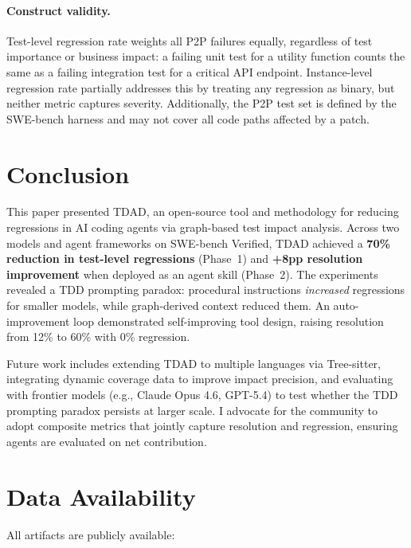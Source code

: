 \documentclass[sigconf,nonacm]{acmart}
\begin{document}
\paragraph{Construct validity.}
Test-level regression rate weights all P2P failures equally, regardless
of test importance or business impact: a failing unit test for a
utility function counts the same as a failing integration test for a
critical API endpoint.  Instance-level regression rate partially
addresses this by treating any regression as binary, but neither metric
captures severity.  Additionally, the P2P test set is defined by the
SWE-bench harness and may not cover all code paths affected by a patch.


\section{Conclusion}
\label{sec:conclusion}

This paper presented \textsc{TDAD}, an open-source tool and methodology for reducing
regressions in AI coding agents via graph-based test impact analysis.  Across
two models and agent frameworks on SWE-bench Verified, \textsc{TDAD} achieved
a \textbf{70\% reduction in test-level regressions} (Phase~1) and
\textbf{+8pp resolution improvement} when deployed as an agent skill
(Phase~2).  The experiments revealed a TDD prompting paradox: procedural instructions
\emph{increased} regressions for smaller models, while graph-derived context
reduced them.  An auto-improvement loop demonstrated self-improving tool
design, raising resolution from 12\% to 60\% with 0\% regression.

Future work includes extending \textsc{TDAD} to multiple languages via
Tree-sitter, integrating dynamic coverage data to improve impact precision,
and evaluating with frontier models (e.g., Claude Opus 4.6, GPT-5.4) to test
whether the TDD prompting paradox persists at larger scale.  I advocate for
the community to adopt composite metrics that jointly capture resolution and
regression, ensuring agents are evaluated on net contribution.


\section{Data Availability}
\label{sec:data}

All artifacts are publicly available:
\end{document}
